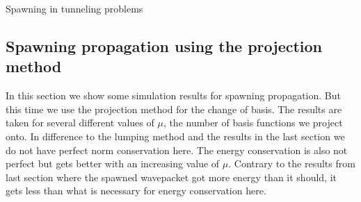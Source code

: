 \begin{chapter}{Spawning in tunneling problems}
\FloatBarrier
\subsection{Spawning propagation using the projection method}

In this section we show some simulation results for spawning propagation. But this
time we use the projection method for the change of basis. The results are taken
for several different values of $\mu$, the number of basis functions we project onto.
In difference to the lumping method and the results in the last section we do not have
perfect norm conservation here. The energy conservation is also not perfect but
gets better with an increasing value of $\mu$. Contrary to the results from last
section where the spawned wavepacket got more energy than it should, it gets less
than what is necessary for energy conservation here. 


\end{chapter}
